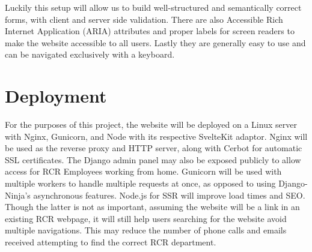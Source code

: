 Luckily this setup will allow us to build well-structured and semantically correct forms, with client and server side validation. There are also Accessible Rich Internet Application (ARIA) attributes and proper labels for screen readers to make the website accessible to all users. Lastly they are generally easy to use and can be navigated exclusively with a keyboard. 

\section{Deployment}
For the purposes of this project, the website will be deployed on a Linux server with Nginx, Gunicorn, and Node with its respective SvelteKit adaptor. Nginx will be used as the reverse proxy and HTTP server, along with Cerbot for automatic SSL certificates. The Django admin panel may also be exposed publicly to allow access for RCR Employees working from home. Gunicorn will be used with multiple workers to handle multiple requests at once, as opposed to using Django-Ninja's asynchronous features. Node.js for SSR will improve load times and SEO. Though the latter is not as important, assuming the website will be a link in an existing RCR webpage, it will still help users searching for the website avoid multiple navigations. This may reduce the number of phone calls and emails received attempting to find the correct RCR department.


